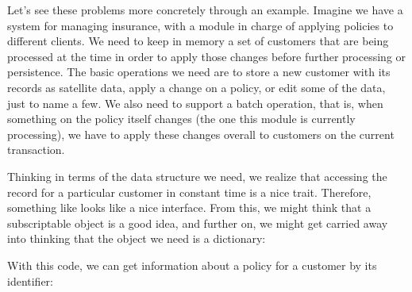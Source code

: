 \documentclass[a4paper,10pt,english]{sphinxmanual}
\begin{document}
Let’s see these problems more concretely through an example. Imagine we have a system for managing insurance,
with a module in charge of applying policies to different clients. We need to keep in memory a set of
customers that are being processed at the time in order to apply those changes before further processing or
persistence. The basic operations we need are to store a new customer with its records as satellite data,
apply a change on a policy, or edit some of the data, just to name a few. We also need to support a batch
operation, that is, when something on the policy itself changes (the one this module is currently processing),
we have to apply these changes overall to customers on the current transaction.

Thinking in terms of the data structure we need, we realize that accessing the record for a particular
customer in constant time is a nice trait. Therefore, something like 
looks like a nice interface. From this, we might think that a subscriptable object is a good idea, and further
on, we might get carried away into thinking that the object we need is a dictionary:

\begin{sphinxVerbatim}[commandchars=\\\{\}]
 

       
        \PYG{p}{[}\PYG{p}{]}
\end{sphinxVerbatim}

With this code, we can get information about a policy for a customer by its identifier:
\end{document}
